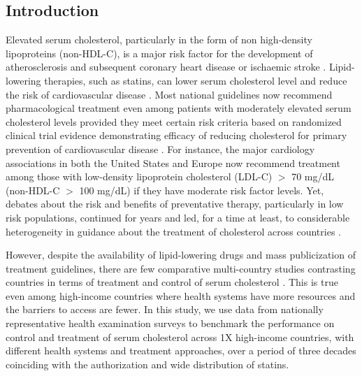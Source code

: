 \documentclass[12pt]{article}
\begin{document}
\begin{refsection}
\section{Introduction} \label{sec:introduction}
Elevated serum cholesterol, particularly in the form of non high-density lipoproteins (non-HDL-C), is a major risk factor for the development of atherosclerosis and subsequent coronary heart disease or ischaemic stroke \cite{prospective_studies_collaboration_blood_2007,law_by_1994}. Lipid-lowering therapies, such as statins, can lower serum cholesterol level and reduce the risk of cardiovascular disease \cite{cholesterol_treatment_trialists_ctt_collaboration_efficacy_2005,cholesterol_treatment_trialists_ctt_collaboration_efficacy_2010}. Most national guidelines now recommend pharmacological treatment even among patients with moderately elevated serum cholesterol levels provided they meet certain risk criteria \cite{grundy_scott_m_2018_2019,mach_2019_2020,rabar_lipid_2014,kinoshita_japan_2018,rhee_2018_2019,national_heart_foundation_of_australia_and_the_cardiac_society_of_australia_and_new_zealand_position_2005} based on randomized clinical trial evidence demonstrating efficacy of reducing cholesterol for primary prevention of cardiovascular disease \cite{cholesterol_treatment_trialists_ctt_collaborators_effects_2012}. For instance, the major cardiology associations in both the United States \cite{grundy_scott_m_2018_2019} and Europe \cite{mach_2019_2020} now recommend treatment among those with low-density lipoprotein cholesterol (LDL-C) $>$ 70 mg/dL (non-HDL-C $>$ 100 mg/dL) if they have moderate risk factor levels. Yet, debates about the risk and benefits of preventative therapy, particularly in low risk populations, continued for years and led, for a time at least, to considerable heterogeneity in guidance about the treatment of cholesterol across countries \cite{smith_should_1992,abramson_should_2013}. 

However, despite the availability of lipid-lowering drugs and mass publicization of treatment guidelines, there are few comparative multi-country studies contrasting countries in terms of treatment and control of serum cholesterol \cite{roth_high_2011,marcus_use_2022,taddei_repositioning_2020-1}. This is true even among high-income countries where health systems have more resources and the barriers to access are fewer. In this study, we use data from nationally representative health examination surveys to benchmark the performance on control and treatment of serum cholesterol across 1X high-income countries, with different health systems and treatment approaches, over a period of three decades coinciding with the authorization and wide distribution of statins. 


\end{refsection}
\end{document}
